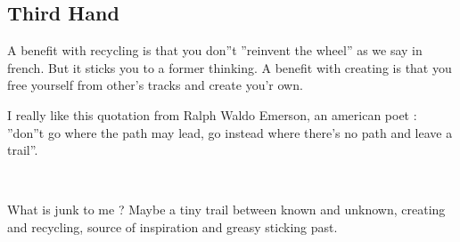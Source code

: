 \subsection{Third Hand}

A benefit with recycling is that you don{\textquotedblright}t
{\textquotedblright}reinvent the wheel{\textquotedblright} as we say in
french. But it sticks you to a former thinking. A benefit with creating
is that you free yourself from other{\textquoteright}s tracks and
create you{\textquoteright}r own.

I really like this quotation from Ralph Waldo Emerson, an american poet
: {\textquotedblright}don{\textquotedblright}t go where the path may
lead, go instead where there{\textquoteright}s no path and leave a
trail{\textquotedblright}.

~

What is junk to me ? Maybe a tiny trail between known and unknown,
creating and recycling, source of inspiration and greasy sticking past.

~
